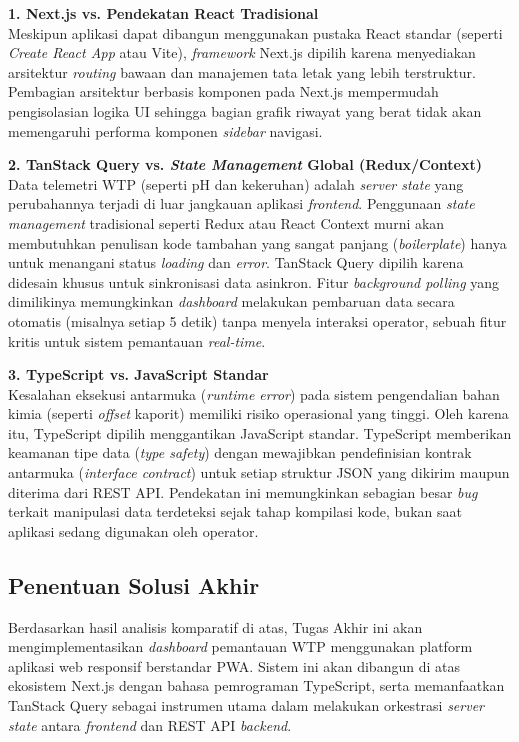 \textbf{1. Next.js vs. Pendekatan React Tradisional} \\
Meskipun aplikasi dapat dibangun menggunakan pustaka React standar (seperti \textit{Create React App} atau Vite), 
\textit{framework} Next.js dipilih karena menyediakan arsitektur \textit{routing} bawaan dan manajemen tata letak 
yang lebih terstruktur. Pembagian arsitektur berbasis komponen pada Next.js mempermudah pengisolasian logika UI 
sehingga bagian grafik riwayat yang berat tidak akan memengaruhi performa komponen \textit{sidebar} navigasi. 

\textbf{2. TanStack Query vs. \textit{State Management} Global (Redux/Context)} \\
Data telemetri WTP (seperti pH dan kekeruhan) adalah \textit{server state} yang perubahannya terjadi di luar 
jangkauan aplikasi \textit{frontend}. Penggunaan \textit{state management} tradisional seperti Redux atau React 
Context murni akan membutuhkan penulisan kode tambahan yang sangat panjang (\textit{boilerplate}) hanya untuk 
menangani status \textit{loading} dan \textit{error}. TanStack Query dipilih karena didesain khusus untuk sinkronisasi 
data asinkron. Fitur \textit{background polling} yang dimilikinya memungkinkan \textit{dashboard} melakukan pembaruan 
data secara otomatis (misalnya setiap 5 detik) tanpa menyela interaksi operator, sebuah fitur kritis untuk sistem pemantauan 
\textit{real-time}.

\textbf{3. TypeScript vs. JavaScript Standar} \\
Kesalahan eksekusi antarmuka (\textit{runtime error}) pada sistem pengendalian bahan kimia (seperti \textit{offset} kaporit) 
memiliki risiko operasional yang tinggi. Oleh karena itu, TypeScript dipilih menggantikan JavaScript standar. TypeScript 
memberikan keamanan tipe data (\textit{type safety}) dengan mewajibkan pendefinisian kontrak antarmuka (\textit{interface contract}) 
untuk setiap struktur JSON yang dikirim maupun diterima dari REST API. Pendekatan ini memungkinkan sebagian besar \textit{bug} terkait 
manipulasi data terdeteksi sejak tahap kompilasi kode, bukan saat aplikasi sedang digunakan oleh operator.

\subsection{Penentuan Solusi Akhir}
Berdasarkan hasil analisis komparatif di atas, Tugas Akhir ini akan mengimplementasikan \textit{dashboard} pemantauan WTP 
menggunakan platform aplikasi web responsif berstandar PWA. Sistem ini akan dibangun di atas ekosistem Next.js dengan bahasa 
pemrograman TypeScript, serta memanfaatkan TanStack Query sebagai instrumen utama dalam melakukan orkestrasi \textit{server state} 
antara \textit{frontend} dan REST API \textit{backend}.